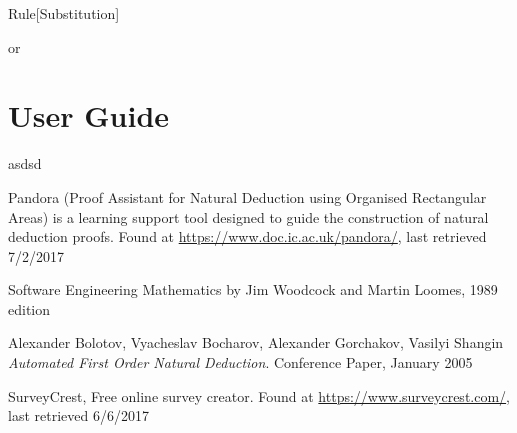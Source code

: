 \begin{namedthm}{Rule}[Substitution]

\begin{bprooftree}
\end{bprooftree}\qquad or \qquad
\begin{bprooftree}
\end{bprooftree}

\end{namedthm}

\pagebreak

\section{User Guide}
 \label{appendix:userGuide}
 
 asdsd

\pagebreak

 
 \label{appendix:surveyCrest}

\begin{thebibliography}{9}

Pandora (Proof Assistant for Natural Deduction using Organised Rectangular Areas) is a learning support tool designed to guide the construction of natural deduction proofs. Found at \url{https://www.doc.ic.ac.uk/pandora/}, last retrieved 7/2/2017

Software Engineering Mathematics by Jim Woodcock and Martin Loomes, 1989 edition

Alexander Bolotov, Vyacheslav Bocharov, Alexander Gorchakov, Vasilyi Shangin \textit{Automated First Order Natural Deduction}. Conference Paper, January 2005

SurveyCrest, Free online survey creator. Found at \url{ https://www.surveycrest.com/}, last retrieved 6/6/2017


\end{thebibliography}




